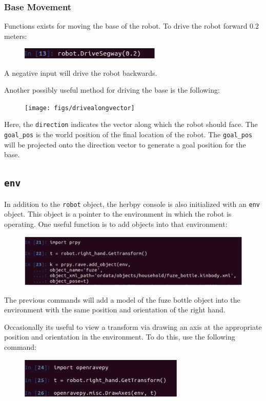 \documentclass[11pt, oneside]{article}
\begin{document}
\newpage
\subsubsection{Base Movement}
Functions exists for moving the base of the robot.  To drive the robot forward 0.2 meters:
\begin{figure}[h]
\centering
\includegraphics[width=0.6\textwidth]{figs/drivesegway}
\end{figure}
A negative input will drive the robot backwards.

Another possibly useful method for driving the base is the following:
\begin{figure}[h]
\centering
\texttt{[image: figs/drivealongvector]}
\end{figure}
Here, the \texttt{direction} indicates the vector along which the robot should face.  The \texttt{goal\_pos} is the world position of the final location of the robot.  The \texttt{goal\_pos} will be projected onto the direction vector to generate a goal position for the base.

\subsection{\texttt{env}}
In addition to the \texttt{robot} object, the herbpy console is also initialized with an \texttt{env} object.  This object is a pointer to the environment in which the robot is operating.  One useful function is to add objects into that environment:
\begin{figure}[h]
\centering
\includegraphics[width=\textwidth]{figs/addobject}
\end{figure}

The previous commands will add a model of the fuze bottle object into the environment with the same position and orientation of the right hand.  

Occasionally its useful to view a transform via drawing an axis at the appropriate position and orientation in the environment.  To do this, use the following command:
\begin{figure}[h]
\centering
\includegraphics[width=0.7\textwidth]{figs/drawaxes}
\end{figure}
\end{document}
